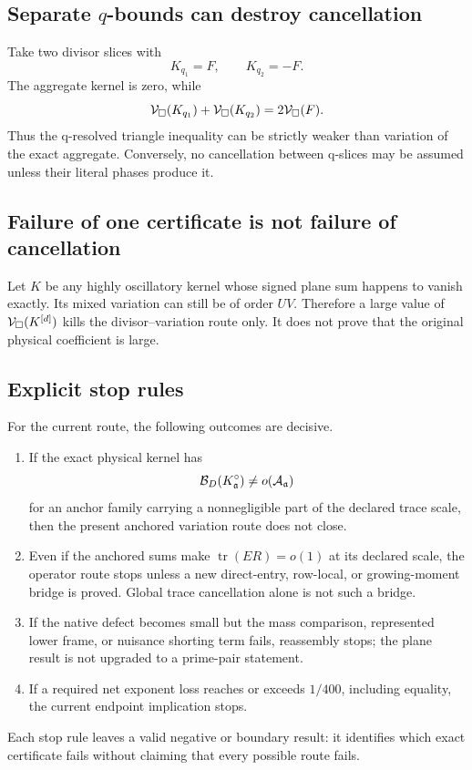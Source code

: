 \subsection{Separate \texorpdfstring{\(q\)}{q}-bounds can destroy cancellation}

Take two divisor slices with
\[
 K_{q_1}=F,\qquad K_{q_2}=-F.
\]
The aggregate kernel is zero, while
\[
 \mathcal V_\square(K_{q_1})+\mathcal V_\square(K_{q_2})
 =
 2\mathcal V_\square(F).
\]
Thus the q-resolved triangle inequality can be strictly weaker than
variation of the exact aggregate.  Conversely, no cancellation between
q-slices may be assumed unless their literal phases produce it.

\subsection{Failure of one certificate is not failure of cancellation}

Let \(K\) be any highly oscillatory kernel whose signed plane sum happens
to vanish exactly.  Its mixed variation can still be of order \(UV\).
Therefore a large value of
\(\mathcal V_\square(K^{[d]})\) kills the divisor--variation route only.  It does
not prove that the original physical coefficient is large.

\subsection{Explicit stop rules}

For the current route, the following outcomes are decisive.

\begin{enumerate}[label=\textup{K\arabic*.},leftmargin=2.4em]
 \item If the exact physical kernel has
 \[
 \mathcal B_D(K^\circ_{\mathfrak a})
 \not=o(\mathcal A_{\mathfrak a})
 \]
 for an anchor family carrying a nonnegligible part of the declared trace
 scale, then the present anchored variation route does not close.
 \item Even if the anchored sums make
 \(\operatorname{tr}(ER)=o(1)\) at its declared scale, the operator route
 stops unless a new direct-entry, row-local, or growing-moment bridge is
 proved.  Global trace cancellation alone is not such a bridge.
 \item If the native defect becomes small but the mass comparison,
 represented lower frame, or nuisance shorting term fails, reassembly
 stops; the plane result is not upgraded to a prime-pair statement.
 \item If a required net exponent loss reaches or exceeds \(1/400\),
 including equality, the current endpoint implication stops.
\end{enumerate}

Each stop rule leaves a valid negative or boundary result: it identifies
which exact certificate fails without claiming that every possible route
fails.
